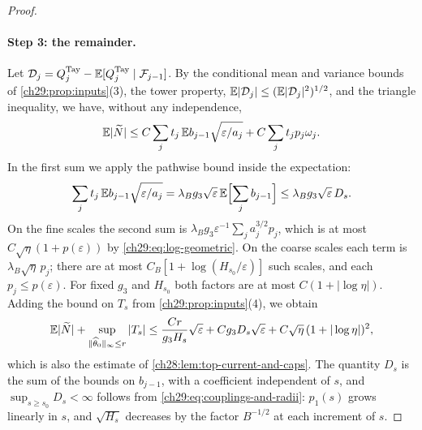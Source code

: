 \begin{proof}
\paragraph{Step 3: the remainder.}
Let $\mathcal D_j=Q_j^{\rm Tay}-\mathbb E[Q_j^{\rm Tay}\mid\mathcal F_{j-1}]$. By the conditional mean and variance bounds of \cref{ch29:prop:inputs}(3), the tower property, $\mathbb E|\mathcal D_j|\le(\mathbb E|\mathcal D_j|^2)^{1/2}$, and the triangle inequality, we have, without any independence,
\begin{equation}\label{ch29:eq:averaged-remainder}
 \mathbb E|\widetilde N|\le C\sum_jt_j\,\mathbb E b_{j-1}\sqrt{\varepsilon/a_j}+C\sum_jt_jp_j\omega_j.
\end{equation}
In the first sum we apply the pathwise bound inside the expectation:
\[
 \sum_jt_j\,\mathbb E b_{j-1}\sqrt{\varepsilon/a_j}=\lambda_Bg_3\sqrt\varepsilon\,\mathbb E\Bigl[\sum_jb_{j-1}\Bigr]\le\lambda_Bg_3\sqrt\varepsilon\,D_s.
\]
On the fine scales the second sum is $\lambda_Bg_3\varepsilon^{-1}\sum_ja_j^{3/2}p_j$, which is at most $C\sqrt\eta(1+p(\varepsilon))$ by \eqref{ch29:eq:log-geometric}. On the coarse scales each term is $\lambda_B\sqrt\eta\,p_j$; there are at most $C_B[1+\log(H_{s_0}/\varepsilon)]$ such scales, and each $p_j\le p(\varepsilon)$. For fixed $g_3$ and $H_{s_0}$ both factors are at most $C(1+|\log\eta|)$. Adding the bound on $T_s$ from \cref{ch29:prop:inputs}(4), we obtain
\begin{equation}\label{ch29:eq:nonmartingale-bound}
 \mathbb E|\widetilde N|+\sup_{\|\widehat\theta_0\|_\infty\le r}|T_s|\le\frac{Cr}{g_3H_s}\sqrt\varepsilon+Cg_3D_s\sqrt\varepsilon+C\sqrt\eta\,(1+|\log\eta|)^2,
\end{equation}
which is also the estimate of \cref{ch28:lem:top-current-and-caps}. The quantity $D_s$ is the sum of the bounds on $b_{j-1}$, with a coefficient independent of $s$, and $\sup_{s\ge s_0}D_s<\infty$ follows from \eqref{ch29:eq:couplings-and-radii}: $p_1(s)$ grows linearly in $s$, and $\sqrt{H_s}$ decreases by the factor $B^{-1/2}$ at each increment of $s$.


\end{proof}
